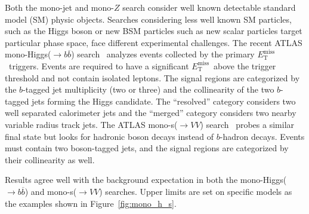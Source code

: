 \documentclass{moriond}
\def\et{E_\mathrm{T}^{\mathrm{miss}}}
\begin{document}
Both the mono-jet and mono-$Z$ search consider well known detectable standard
model (SM) physic objects. Searches considering less well known SM particles,
such as the Higgs boson or new BSM particles such as new scalar particles
target particular phase space, face different experimental challenges. The
recent ATLAS mono-Higgs($\rightarrow b\overline{b}$) search~\cite{monoh}
analyzes events collected by the primary $\et$\ triggers. Events are required
to have a significant $\et$\ above the trigger threshold and not contain
isolated leptons. The signal regions are categorized by the $b$-tagged jet
multiplicity (two or three) and the collinearity of the two $b$-tagged jets
forming the Higgs candidate. The ``resolved'' category considers two well
separated calorimeter jets and the ``merged'' category considers two nearby
variable radius track jets. The ATLAS mono-s($\rightarrow VV$) search~\cite{monos}
probes a similar final state but looks for hadronic boson decays instead of
$b$-hadron decays. Events must contain two boson-tagged jets, and the signal
regions are categorized by their collinearity as well. 

Results agree well with the background expectation in both the mono-Higgs($\rightarrow b\overline{b}$) and mono-s($\rightarrow VV$) searches. Upper limits are set on specific models as the examples shown in Figure~\ref{fig:mono_h_s}.      
\end{document}

